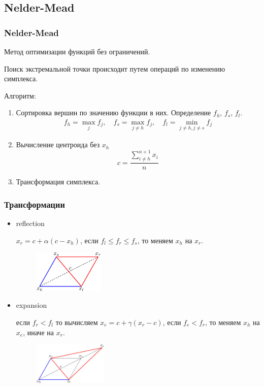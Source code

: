 \subsection{Nelder-Mead}

\begin{frame}
  \frametitle{Nelder-Mead}

  Метод оптимизации функций без ограничений. 
  
  Поиск экстремальной точки происходит путем операций по изменению симплекса.

  Алгоритм:
  \begin{enumerate}
    \item Сортировка вершин по значению функции в них. Определение $f_h$, $f_s$, $f_l$.
    \begin{align*}
      f_h = \max_j f_j, \quad f_s = \max_{j \neq h} f_j, \quad f_l = \min_{j \neq h, j\neq s} f_j
    \end{align*}

    \item Вычисление центроида без $x_h$
    \begin{equation*}
      c = \frac{\sum_{i \neq h}^{n+1} x_i}{n}
    \end{equation*}
    \item Трансформация симплекса.
  \end{enumerate}


\end{frame}

\begin{frame}
  \frametitle{Трансформации}
  \begin{itemize}
    \item reflection 

      $x_r = c + \alpha(c - x_h)$, если $f_l \leq f_r \leq f_s$, то меняем $x_h$ на $x_r$.
      \begin{figure}
      \includegraphics[height=2cm]{figures/reflection.jpg}
      \end{figure}

    \item expansion

    если $f_r < f_l$ то вычисляем $x_e = c + \gamma(x_r - c)$, если $f_e < f_r$, то меняем $x_h$ на $x_e$, иначе на $x_r$.
      \begin{figure}
      \includegraphics[height=2cm]{figures/expansion.jpg}
      \end{figure}

  \end{itemize}
\end{frame}

